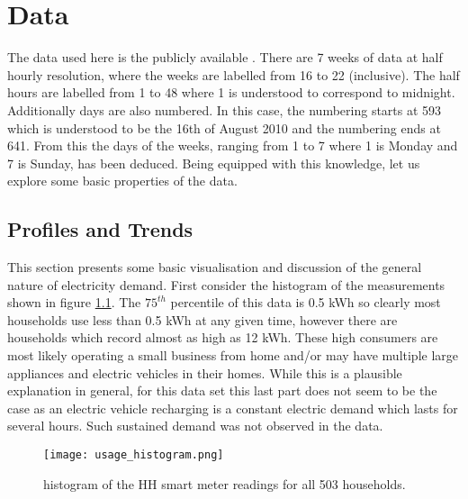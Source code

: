 
\chapter{Data} \label{sec:results}

The data used here is the publicly available  . There are 7 weeks of data at half hourly resolution, where the weeks are labelled from 16 to 22 (inclusive). The half hours are labelled from 1 to 48 where 1 is understood to correspond to midnight. Additionally days are also numbered. In this case, the numbering starts at 593 which is understood to be the 16th of August 2010 and the numbering ends at 641. From this the days of the weeks, ranging from 1 to 7 where 1 is Monday and 7 is Sunday, has been deduced. Being equipped with this knowledge, let us explore some basic properties of the data.

\section{Profiles and Trends}
\label{subsec:basic} 
This section presents some basic visualisation and discussion of the general nature of electricity demand. First consider the histogram of the measurements shown in figure \ref{fig:hist}. The $75^{th}$ percentile of this data is 0.5 kWh so clearly most households use less than 0.5 kWh at any given time, however there are households which record almost as high as 12 kWh. These high consumers are most likely operating a small business from home and/or may have multiple large appliances and electric vehicles in their homes.  While this is a plausible explanation in general, for this data set this last part does not seem to be the case as an electric vehicle recharging is a constant electric demand which lasts for several hours. Such sustained demand was not observed in the data.

\begin{figure}
\centering
\texttt{[image: usage\_histogram.png]}
\caption{histogram of the HH smart meter readings for all 503 households.}
\label{fig:hist} 
\end{figure}

